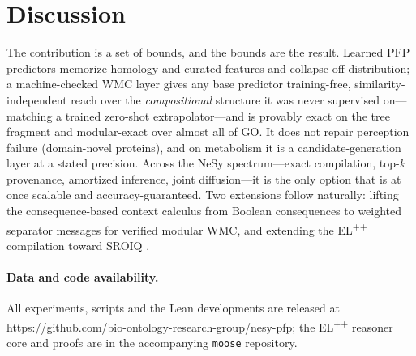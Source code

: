 \documentclass[11pt]{article}
\begin{document}
\section{Discussion}
The contribution is a set of bounds, and the bounds are the result. Learned PFP predictors
memorize homology and curated features and collapse off-distribution; a machine-checked WMC layer
gives any base predictor training-free, similarity-independent reach over the \emph{compositional}
structure it was never supervised on---matching a trained zero-shot extrapolator---and is provably
exact on the tree fragment and modular-exact over almost all of GO. It does not repair perception
failure (domain-novel proteins), and on metabolism it is a candidate-generation layer at a stated
precision. Across the NeSy spectrum---exact compilation, top-$k$ provenance, amortized inference,
joint diffusion---it is the only option that is at once scalable and accuracy-guaranteed. Two
extensions follow naturally: lifting the consequence-based context calculus
\citep{bate2016sriq,tenacucala2019sequoia} from Boolean consequences to weighted separator
messages for verified modular WMC, and extending the EL\textsuperscript{++} compilation toward
SROIQ \citep{horrocks2006sroiq,motik2009hypertableau}.

\paragraph{Data and code availability.}
All experiments, scripts and the Lean developments are released at
\url{https://github.com/bio-ontology-research-group/nesy-pfp}; the EL\textsuperscript{++} reasoner
core and proofs are in the accompanying \texttt{moose} repository.

{\small}
\end{document}
